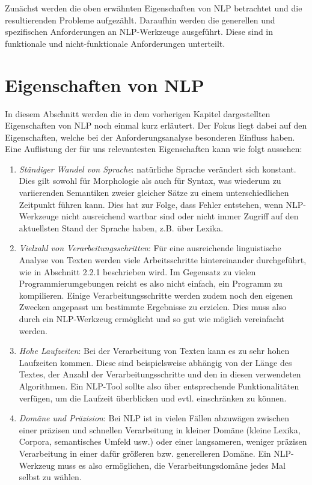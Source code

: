 \documentclass[12pt]{report}
\begin{document}
Zunächst werden die oben erwähnten Eigenschaften von NLP betrachtet und die resultierenden Probleme aufgezählt. Daraufhin werden die generellen und spezifischen Anforderungen an NLP-Werkzeuge ausgeführt. Diese sind in funktionale und nicht-funktionale Anforderungen unterteilt.

\section{Eigenschaften von NLP}
In diesem Abschnitt werden die in dem vorherigen Kapitel dargestellten Eigenschaften von NLP noch einmal kurz erläutert. Der Fokus liegt dabei auf den Eigenschaften, welche bei der Anforderungsanalyse besonderen Einfluss haben. Eine Auflistung der für uns relevantesten Eigenschaften kann wie folgt aussehen:

\begin{enumerate}
\item \textit{Ständiger Wandel von Sprache}: natürliche Sprache verändert sich konstant. Dies gilt sowohl für Morphologie als auch für Syntax, was wiederum zu variierenden Semantiken zweier gleicher Sätze zu einem unterschiedlichen Zeitpunkt führen kann. Dies hat zur Folge, dass Fehler entstehen, wenn NLP-Werkzeuge nicht ausreichend wartbar sind oder nicht immer Zugriff auf den aktuellsten Stand der Sprache haben, z.B. über Lexika.
\item \textit{Vielzahl von Verarbeitungsschritten}: Für eine ausreichende linguistische Analyse von Texten werden viele Arbeitsschritte hintereinander durchgeführt, wie in Abschnitt 2.2.1 beschrieben wird. Im Gegensatz zu vielen Programmierumgebungen reicht es also nicht einfach, ein Programm zu kompilieren. Einige Verarbeitungsschritte werden zudem noch den eigenen Zwecken angepasst um bestimmte Ergebnisse zu erzielen. Dies muss also durch ein NLP-Werkzeug ermöglicht und so gut wie möglich vereinfacht werden.
\item \textit{Hohe Laufzeiten}: Bei der Verarbeitung von Texten kann es zu sehr hohen Laufzeiten kommen. Diese sind beispielsweise abhängig von der Länge des Textes, der Anzahl der Verarbeitungsschritte und den in diesen verwendeten Algorithmen. Ein NLP-Tool sollte also über entsprechende Funktionalitäten verfügen, um die Laufzeit überblicken und evtl. einschränken zu können. 
\item \textit{Domäne und Präzision}: Bei NLP ist in vielen Fällen abzuwägen zwischen einer präzisen und schnellen Verarbeitung in kleiner Domäne (kleine Lexika, Corpora, semantisches Umfeld usw.) oder einer langsameren, weniger präzisen Verarbeitung in einer dafür größeren bzw. generelleren Domäne. Ein NLP-Werkzeug muss es also ermöglichen, die Verarbeitungsdomäne jedes Mal selbst zu wählen.
\end{enumerate}
\end{document}
